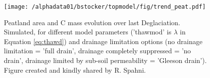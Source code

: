 



\begin{figure}[ht!]
\begin{center}
  \texttt{[image: /alphadata01/bstocker/topmodel/fig/trend\_peat.pdf]}
\end{center}
\caption{Peatland area and C mass evolution over last Deglaciation. Simulated, for different model parameters ('thawmod' is $\lambda$ in Equation \ref{eq:thawd}) and drainage limitation options (no drainage limitation = 'full drain', drainage completely suppressed = 'no drain', drainage limited by sub-soil permeability = 'Gleeson drain'). Figure created and kindly shared by R. Spahni.}
\label{fig:fpeat_LGM_pres}
\end{figure}


